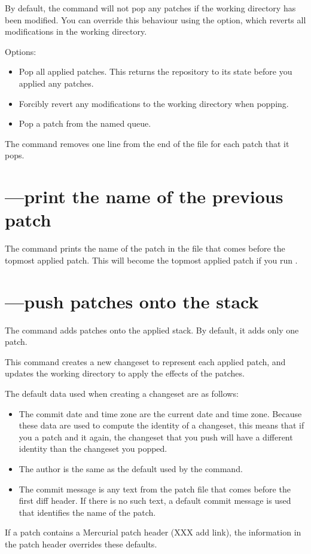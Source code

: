By default, the  command will not pop any patches if the
working directory has been modified.  You can override this behaviour
using the  option, which reverts all modifications in
the working directory.

Options:
\begin{itemize}
\item[\hgxopt{mq}{qpop}{-a}] Pop all applied patches.  This returns the
  repository to its state before you applied any patches.
\item[\hgxopt{mq}{qpop}{-f}] Forcibly revert any modifications to the
  working directory when popping.
\item[\hgxopt{mq}{qpop}{-n}] Pop a patch from the named queue.
\end{itemize}

The  command removes one line from the end of the
 file for each patch that it pops.

\section{---print the name of the previous patch}

The  command prints the name of the patch in the
 file that comes before the topmost applied patch.
This will become the topmost applied patch if you run .

\section{---push patches onto the stack}
\label{sec:mqref:cmd:qpush}

The  command adds patches onto the applied stack.  By
default, it adds only one patch.

This command creates a new changeset to represent each applied patch,
and updates the working directory to apply the effects of the patches.

The default data used when creating a changeset are as follows:
\begin{itemize}
\item The commit date and time zone are the current date and time
  zone.  Because these data are used to compute the identity of a
  changeset, this means that if you  a patch and
   it again, the changeset that you push will have a
  different identity than the changeset you popped.
\item The author is the same as the default used by the 
  command.
\item The commit message is any text from the patch file that comes
  before the first diff header.  If there is no such text, a default
  commit message is used that identifies the name of the patch.
\end{itemize}
If a patch contains a Mercurial patch header (XXX add link), the
information in the patch header overrides these defaults.

